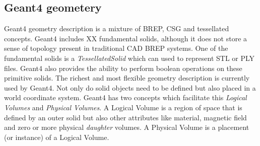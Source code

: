 \documentclass[final,5p,times,twocolumn]{elsarticle}
\begin{document}
\subsection{Geant4 geometery}
Geant4 geometry description is a mixture of BREP, CSG and tessellated concepts. Geant4 includes XX fundamental solids, although it does not store a sense 
of topology present in traditional CAD BREP systems. One of the fundamental solids is a {\em TessellatedSolid} which can used to represent STL or PLY files. 
Geant4 also provides the ability to perform boolean operations on these primitive solids. The richest and most flexible geometry description is currently used by
Geant4. Not only do solid objects need to be defined but also placed in a world coordinate system. Geant4 has two concepts which facilitate this {\it Logical Volumes} 
and {\it Physical Volumes}. A Logical Volume is a region of space  that is defined by an outer solid but also other attributes like material, magnetic field and zero or 
more physical {\it daughter} volumes. A Physical Volume is a placement (or instance) of a Logical Volume.   
\end{document}
